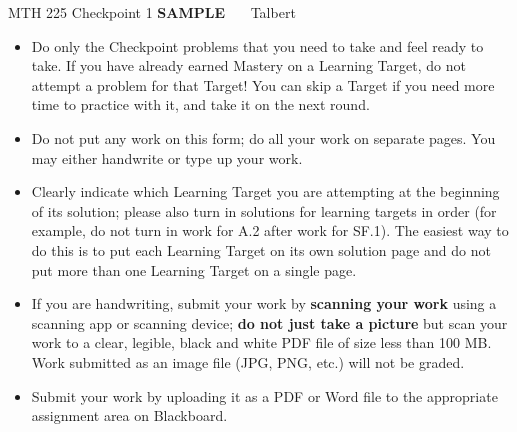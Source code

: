 \documentclass[11 pt]{article}
\begin{document}
\noindent MTH 225 Checkpoint 1 \textbf{SAMPLE} \ \ \  \hfill Talbert \\


\begin{itemize}
    \item Do only the Checkpoint problems that you need to take and feel ready to take. If you have already earned Mastery on a Learning Target, do not attempt a problem for that Target! You can skip a Target if you need more time to practice with it, and take it on the next round. 
    \item Do not put any work on this form; do all your work on separate pages. You may either handwrite or type up your work. 
    \item Clearly indicate which Learning Target you are attempting at the beginning of its solution; please also turn in solutions for learning targets in order (for example, do not turn in work for A.2 after work for SF.1). The easiest way to do this is to put each Learning Target on its own solution page and do not put more than one Learning Target on a single page. 
    \item If you are handwriting, submit your work by \textbf{scanning your work} using a scanning app or scanning device; \textbf{do not just take a picture} but scan your work to a clear, legible, black and white PDF file of size less than 100 MB. Work submitted as an image file (JPG, PNG, etc.) will not be graded. 
    \item Submit your work by uploading it as a PDF or Word file to the appropriate assignment area on Blackboard.  
\end{itemize}



\noindent \hrulefill
\end{document}
